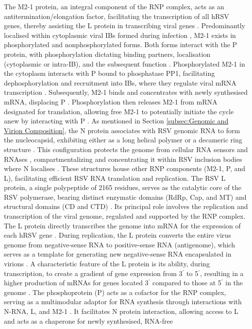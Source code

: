 The M2-1 protein, an integral component of the RNP complex, acts as an antitermination/elongation factor, facilitating the transcription of all hRSV genes, thereby assisting the L protein in transcribing viral genes \cite{Collins1996TranscriptionVirus., Noton2015InitiationReplication}. Predominantly localised within cytoplasmic viral IBs formed during infection \cite{Rincheval2017FunctionalVirus}, M2-1 exists in phosphorylated and nonphosphorylated forms. Both forms interact with the P protein, with phosphorylation dictating binding partners, localisation (cytoplasmic or intra-IB), and the subsequent function \cite{Richard2018RSVTranscription}. Phosphorylated M2-1 in the cytoplasm interacts with P bound to phosphatase PP1, facilitating dephosphorylation and recruitment into IBs, where they regulate viral mRNA transcription \cite{Richard2018RSVTranscription}. Subsequently, M2-1 binds and concentrates with newly synthesised mRNA, displacing P \cite{Blondot2012StructureProtein.}. Phosphorylation then releases M2-1 from mRNA designated for translation, allowing free M2-1 to potentially initiate the cycle anew by interacting with P \cite{Richard2018RSVTranscription}. As mentioned in Section \ref{subsec:Genomic and Virion Composition}, the N protein associates with RSV genomic RNA to form the nucleocapsid, exhibiting either as a long helical polymer or a decameric ring structure \cite{Gonnin2023StructuralNucleocapsids}. This configuration protects the genome from cellular RNA sensors and RNAses \cite{Tawar2009CrystalVirus}, compartmentalizing and concentrating it within RSV inclusion bodies where N localises \cite{Rincheval2017FunctionalVirus}. These structures house other RNP components (M2-1, P, and L), facilitating efficient RSV RNA translation and replication. The RSV L protein, a single polypeptide of 2165 residues, serves as the catalytic core of the RSV polymerase, bearing distinct enzymatic domains (RdRp, Cap, and MT) and structural domains (CD and CTD) \cite{Gilman2019StructureComplex, Cao2020Cryo-EMPolymerase}. Its principal role involves the replication and transcription of the viral genome, regulated and supported by the RNP complex. The L protein directly transcribes the genome into mRNA for the expression of each hRSV gene \cite{Cowton2006UnravellingSynthesis, Noton2015InitiationReplication}. During replication, the L protein converts the entire virus genome from negative-sense RNA to positive-sense RNA (antigenome), which serves as a template for generating new negative-sense RNA encapsulated in virions \cite{Cowton2006UnravellingSynthesis, Fearns2000FunctionalVirus}. A characteristic feature of the L protein is its ability, during transcription, to create a gradient of gene expression from 3$^{\prime}$ to 5$^{\prime}$, resulting in a higher production of mRNAs for genes located 3$^{\prime}$ compared to those at 5$^{\prime}$ in the genome \cite{Hardy1998TheTranscription, Kuo1996TheMinigenome}. The phosphoprotein (P) acts as a cofactor for the RNP complex, serving as a multimodular adaptor for RNA synthesis through interactions with N-RNA, L, and M2-1 \cite{Blondot2012StructureProtein., Cardone2021APhosphoprotein}. It facilitates N protein interaction, allowing access to L \cite{Sourimant2015FinePhosphoprotein} and acts as a chaperone for newly synthesised, RNA-free 